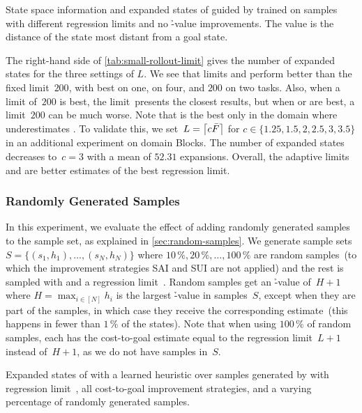 \begin{table}[tb]
    \caption[State space information and expanded states with different regression limits.]{State space information and expanded states of \gbfs guided by \hnn trained on \bfsrw samples with different regression limits and no \h-value improvements. The value \ssdiameter is the distance of the state most distant from a goal state.}
    \label{tab:small-rollout-limit}
    \addmargin
    \centering
    
\end{table}

The right-hand side of \cref{tab:small-rollout-limit} gives the number of expanded states for the three settings of $L$. We see that limits \facts and \meanfx perform better than the fixed limit~$200$, with \facts best on one, \meanfx on four, and $200$ on two tasks. Also, when a limit of~$200$ is best, the limit~\facts presents the closest results, but when \facts or \meanfx are best, a limit~$200$ can be much worse. Note that \facts is the best only in the domain where \meanfx underestimates \ssdiameter. To validate this, we set~$L=\left\lceil c\bar F\right\rceil$ for $c\in\{1.25,1.5,2,2.5,3,3.5\}$ in an additional experiment on domain Blocks. The number of expanded states decreases to~$c=3$ with a mean of $52.31$ expansions. Overall, the adaptive limits \facts and \meanfx are better estimates of the best regression limit.

\subsubsection{Randomly Generated Samples}
\label{sec:small-exps-random-samples}

In this experiment, we evaluate the effect of adding randomly generated samples to the sample set, as explained in \cref{sec:random-samples}. We generate sample sets~$S=\{(s_1,h_1),\ldots,(s_N,h_N)\}$ where $10\,\%, 20\,\%,\ldots,100\,\%$ are random samples~(to which the improvement strategies SAI and SUI are not applied) and the rest is sampled with \bfsrw and a regression limit~\meanfx. Random samples get an \h-value of~$H+1$ where $H=\max_{i\in[N]} h_i$ is the largest \h-value in samples~$S$, except when they are part of the samples, in which case they receive the corresponding estimate~(this happens in fewer than $1\,\%$ of the states). Note that when using $100\,\%$ of random samples, each has the cost-to-goal estimate equal to the regression limit~$L+1$ instead of~$H+1$, as we do not have samples in~$S$.

\begin{table}[tb]
    \caption[Expanded states from a varying percentage of randomly generated samples.]{Expanded states of \gbfs with a learned heuristic over samples generated by \bfsrw with regression limit~\meanfx, all cost-to-goal improvement strategies, and a varying percentage of randomly generated samples.}
    \label{tab:small-random-samples}
    \addmargin
    \centering
    
\end{table}

